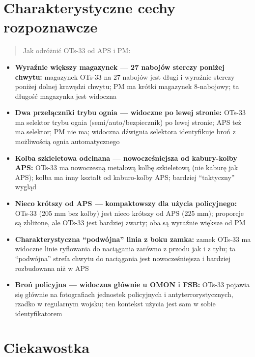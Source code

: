 \documentclass[12pt,openany,oneside]{book}
\providecommand{\tightlist}{%
  \setlength{\itemsep}{0pt}\setlength{\parskip}{0pt}}
\begin{document}
\section{Charakterystyczne cechy
rozpoznawcze}\label{charakterystyczne-cechy-rozpoznawcze-94}

\begin{quote}
Jak odróżnić OTs-33 od APS i PM:
\end{quote}

\begin{itemize}
\tightlist
\item
  \textbf{Wyraźnie większy magazynek --- 27 nabojów sterczy poniżej
  chwytu:} magazynek OTs-33 na 27 nabojów jest długi i wyraźnie sterczy
  poniżej dolnej krawędzi chwytu; PM ma krótki magazynek 8-nabojowy; ta
  długość magazynka jest widoczna
\item
  \textbf{Dwa przełączniki trybu ognia --- widoczne po lewej stronie:}
  OTs-33 ma selektor trybu ognia (semi/auto/bezpiecznik) po lewej
  stronie; APS też ma selektor; PM nie ma; widoczna dźwignia selektora
  identyfikuje broń z możliwością ognia automatycznego
\item
  \textbf{Kolba szkieletowa odcinana --- nowocześniejsza od kabury-kolby
  APS:} OTs-33 ma nowoczesną metalową kolbę szkieletową (nie kaburę jak
  APS); kolba ma inny kształt od kaburo-kolby APS; bardziej
  ``taktyczny'' wygląd
\item
  \textbf{Nieco krótszy od APS --- kompaktowszy dla użycia policyjnego:}
  OTs-33 (205 mm bez kolby) jest nieco krótszy od APS (225 mm);
  proporcje są zbliżone, ale OTs-33 jest bardziej zwarty; oba są
  wyraźnie większe od PM
\item
  \textbf{Charakterystyczna ``podwójna'' linia z boku zamka:} zamek
  OTs-33 ma widoczne linie ryflowania do naciągania zarówno z przodu jak
  i z tyłu; ta ``podwójna'' strefa chwytu do naciągania jest
  nowocześ­niejsza i bardziej rozbudowana niż w APS
\item
  \textbf{Broń policyjna --- widoczna głównie u OMON i FSB:} OTs-33
  pojawia się głównie na fotografiach jednostek policyjnych i
  antyterrorystycznych, rzadko w regularnym wojsku; ten kontekst użycia
  jest sam w sobie identyfikatorem
\end{itemize}

\section{Ciekawostka}\label{ciekawostka-94}
\end{document}
